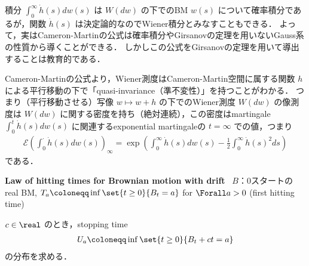 \documentclass{jsarticle}
\begin{document}
\begin{remark*}
    積分 $\int_0^\infty\dot{h}(s)dw(s)$ は $W(dw)$ の下でのBM $w(s)$ について確率積分であるが，関数 $\dot{h}(s)$ は決定論的なのでWiener積分とみなすこともできる．
    よって，実はCameron-Martinの公式は確率積分やGirsanovの定理を用いないGauss系の性質から導くことができる．
    しかしこの公式をGirsanovの定理を用いて導出することは教育的である．

    Cameron-Martinの公式より，Wiener測度はCameron-Martin空間に属する関数 $h$ による平行移動の下で「quasi-invariance（準不変性）」を持つことがわかる．
    つまり（平行移動させる）写像 $w\mapsto w+h$ の下でのWiener測度 $W(dw)$ の像測度は $W(dw)$ に関する密度を持ち（絶対連続），この密度はmartingale $\int_0^t \dot{h}(s)dw(s)$ に関連するexponential martingaleの $t=\infty$ での値，つまり
    \begin{align}
        \mathcal{E}\left(\int_0^{\cdot}\dot{h}(s)dw(s)\right)_\infty
        = \exp\left(\int_0^\infty \dot{h}(s)dw(s)-\frac{1}{2}\int_0^\infty \dot{h}(s)^2 ds\right)
    \end{align}
    である．
\end{remark*}

\textbf{Law of hitting times for Brownian motion with drift}~
$B$：0スタートのreal BM, $T_a\coloneqq\inf\set{t\ge0}{B_t=a}$ for $\Forall a>0$ (first hitting time)

$c\in\real$ のとき，stopping time
\begin{align}
    U_a\coloneqq\inf\set{t\ge0}{B_t+ct=a}
\end{align}
の分布を求める．
\end{document}
